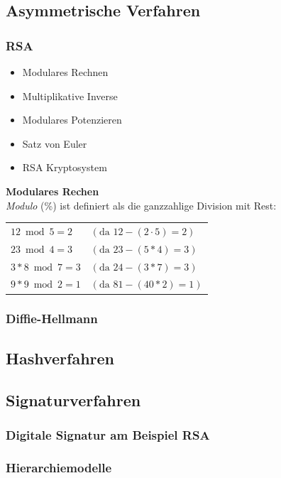\documentclass[a4paper,12pt]{article}
\begin{document}
\subsection{Asymmetrische Verfahren}
\subsubsection{RSA}
\begin{itemize}
    \item Modulares Rechnen
    \item Multiplikative Inverse
    \item Modulares Potenzieren
    \item Satz von Euler
    \item RSA Kryptosystem
\end{itemize}

\noindent\textbf{Modulares Rechen}\\
\textit{Modulo} (\%) ist definiert als die ganzzahlige Division mit Rest: 
\begin{table}[H]
    \centering
    \begin{tabular}{l|l}
        $12 \bmod 5 = 2$ & $(\text{da } 12 - (2 \cdot 5) = 2)$ \\
        $23 \bmod 4 = 3$ & $(\text{da } 23 - (5 * 4) = 3)$ \\
        $3 * 8 \bmod 7 = 3$ & $(\text{da } 24 - (3 * 7) = 3)$ \\
        $9 * 9 \bmod 2 = 1$ & $(\text{da } 81 - (40 * 2) = 1)$ \\
    \end{tabular}
\end{table}



\subsubsection{Diffie-Hellmann}

\subsection{Hashverfahren}

\subsection{Signaturverfahren}
\subsubsection{Digitale Signatur am Beispiel RSA}
\subsubsection{Hierarchiemodelle}
\end{document}
